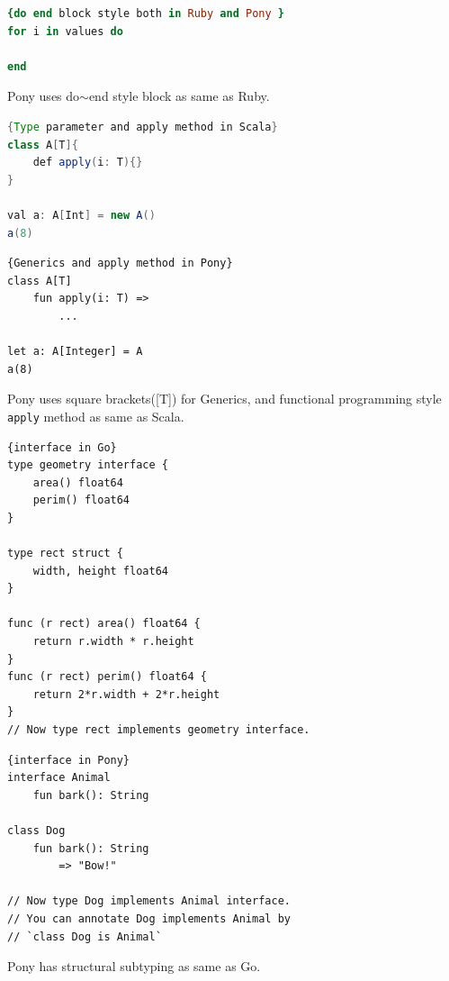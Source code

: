 \documentclass{article}
\begin{document}
\begin{multicols}{2}
\begin{lstlisting}[language=Ruby]{do end block style both in Ruby and Pony }
for i in values do
	
end		
\end{lstlisting}

 Pony uses do$\sim$end style block as same as Ruby. \\


\begin{lstlisting}[language=Java]{Type parameter and apply method in Scala}
class A[T]{
	def apply(i: T){}
}	

val a: A[Int] = new A()
a(8)
\end{lstlisting}

\begin{lstlisting}{Generics and apply method in Pony}
class A[T]
	fun apply(i: T) =>
		...
	
let a: A[Integer] = A
a(8)	
\end{lstlisting}

Pony uses square brackets([T]) for Generics, and functional programming style \texttt{apply} method as same as Scala. \\


\begin{lstlisting}{interface in Go}
type geometry interface {
    area() float64
    perim() float64
}

type rect struct {
    width, height float64
}

func (r rect) area() float64 {
    return r.width * r.height
}
func (r rect) perim() float64 {
    return 2*r.width + 2*r.height
}
// Now type rect implements geometry interface.

\end{lstlisting}

\begin{lstlisting}{interface in Pony}
interface Animal
	fun bark(): String
	
class Dog
	fun bark(): String
		=> "Bow!"	
	
// Now type Dog implements Animal interface.
// You can annotate Dog implements Animal by 
// `class Dog is Animal`
\end{lstlisting}
 
Pony has structural subtyping as same as Go. \\



\end{multicols}
\end{document}
